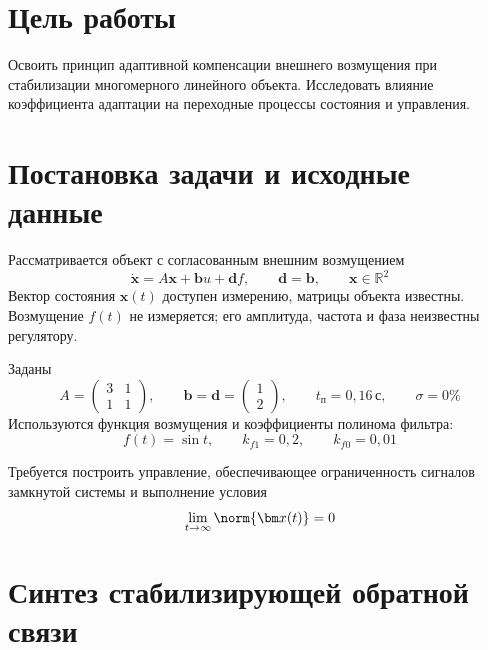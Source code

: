 
\tableofcontents
\newpage

\section{Цель работы}

Освоить принцип адаптивной компенсации внешнего возмущения
при стабилизации многомерного линейного объекта. Исследовать влияние
коэффициента адаптации на переходные процессы состояния и управления.

\section{Постановка задачи и исходные данные}

Рассматривается объект с согласованным внешним возмущением
\begin{equation}
  \dot{\bm x}=A\bm x+\bm b u+\bm d f,
  \qquad \bm d=\bm b,
  \qquad \bm x\in\mathbb R^2
  \label{eq:plant}
\end{equation}
Вектор состояния $\bm x(t)$ доступен измерению, матрицы объекта известны.
Возмущение $f(t)$ не измеряется; его амплитуда, частота и фаза
неизвестны регулятору.

Заданы
\begin{equation}
  A=\begin{pmatrix}3&1\\1&1\end{pmatrix},
  \qquad
  \bm b=\bm d=\begin{pmatrix}1\\2\end{pmatrix},
  \qquad t_{\text{п}}=0{,}16\,\text{с},
  \qquad \sigma=0\%
  \label{eq:variant}
\end{equation}
Используются функция возмущения
и коэффициенты полинома фильтра:
\begin{equation}
  f(t)=\sin t,
  \qquad k_{f1}=0{,}2,
  \qquad k_{f0}=0{,}01
  \label{eq:disturbance-data}
\end{equation}

Требуется построить управление, обеспечивающее ограниченность
сигналов замкнутой системы и выполнение условия
\begin{equation}
  \lim_{t\to\infty}\norm{\bm x(t)}=0
  \label{eq:goal}
\end{equation}

\section{Синтез стабилизирующей обратной связи}

